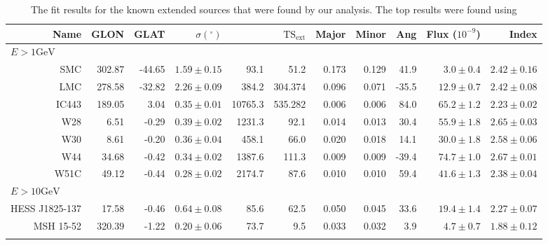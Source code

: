 \documentclass[preprint]{aastex}
\newcommand{\gev}{\text{GeV}\xspace}
\newcommand{\tsext}{\ensuremath{\text{TS}_\text{ext}}\xspace}
\newcommand{\ts}{\text{TS}\xspace}
\begin{document}
\clearpage
\begin{table}
    \begin{centering}
      \begin{tabular}{rrrrrrrrrrr}
        Name           &    GLON &    GLAT & $\sigma(^\circ)$ &     \ts & $\tsext$ & Major & Minor &   Ang & Flux ($10^{-9}$) &         Index \\
        \hline
        \multicolumn{11}{l}{$E > 1\gev$} \\
        \hline
        SMC            & 302.87  &  -44.65 &    $1.59\pm0.15$ &    93.1 &                   51.2 & 0.173 & 0.129 &  41.9 &   $3.0\pm0.4$    & $2.42\pm0.16$ \\
        LMC            & 278.58  &  -32.82 &    $2.26\pm0.09$ &   384.2 &                304.374 & 0.096 & 0.071 & -35.5 &  $12.9\pm0.7$    & $2.42\pm0.08$ \\
        IC443          & 189.05  &  3.04   &    $0.35\pm0.01$ & 10765.3 &                535.282 & 0.006 & 0.006 &  84.0 &  $65.2\pm1.2$    & $2.23\pm0.02$ \\
        W28            & 6.51    &  -0.29  &    $0.39\pm0.02$ &  1231.3 &                   92.1 & 0.014 & 0.013 &  30.4 &  $55.9\pm1.8$    & $2.65\pm0.03$ \\
        W30            & 8.61    &  -0.20  &    $0.36\pm0.04$ &   458.1 &                  66.0  & 0.020 & 0.018 &  14.1 &  $30.0\pm1.8$    & $2.58\pm0.06$ \\
        W44            & 34.68   &  -0.42  &    $0.34\pm0.02$ &  1387.6 &                  111.3 & 0.009 & 0.009 & -39.4 &  $74.7\pm1.0$    & $2.67\pm0.01$ \\
        W51C           & 49.12   &  -0.44  &    $0.28\pm0.02$ &  2174.7 &                   87.6 & 0.010 & 0.010 &  59.4 &  $41.6\pm1.3$    & $2.38\pm0.04$ \\
        \hline
        \multicolumn{11}{l}{$E > 10\gev$} \\
        \hline
        HESS J1825-137 &   17.58 &   -0.46 &    $0.64\pm0.08$ &    85.6 &                   62.5 & 0.050 & 0.045 & 33.6  &     $19.4\pm1.4$ & $2.27\pm0.07$ \\
        MSH 15-52      &  320.39 &   -1.22 &    $0.20\pm0.06$ &    73.7 &                    9.5 & 0.033 & 0.032 & 3.9   &      $4.7\pm0.7$ & $1.88\pm0.12$ \\
      \label{known_extended_sources}
      \end{tabular}
      \caption{The fit results for the known extended sources that
      were found by our analysis. The top results were found using
}
\end{centering}
\end{table}
\end{document}
